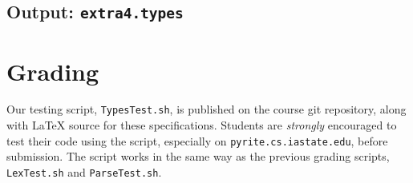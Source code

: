 \documentclass{article}
\begin{document}


\subsection{Output: {\tt extra4.types}}





\section{Grading}

Our testing script, {\tt TypesTest.sh}, is published on the course
git repository, along with \LaTeX{} source for these specifications.
Students are \emph{strongly} encouraged to test their code
using the script, especially on {\tt pyrite.cs.iastate.edu},
before submission.
The script works in the same way as the previous grading scripts,
{\tt LexTest.sh} and {\tt ParseTest.sh}.
\end{document}
